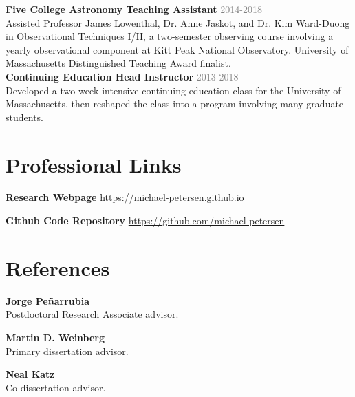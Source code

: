 \documentclass[margin, 11pt]{res} %
\begin{document}
\begin{resume}
{\bf Five College Astronomy Teaching Assistant} \hfill \textcolor{grey}{2014-2018}\\
Assisted Professor James Lowenthal, Dr. Anne Jaskot, and Dr. Kim Ward-Duong in Observational Techniques I/II, a two-semester observing course involving a yearly observational component at Kitt Peak National Observatory. University of Massachusetts Distinguished Teaching Award finalist.\\

{\bf Continuing Education Head Instructor} \hfill \textcolor{grey}{2013-2018}\\
Developed a two-week intensive continuing education class for the University of Massachusetts, then reshaped the class into a program involving many graduate students.

%


\section{\sc \textcolor{redshade}{Professional Links}}
{\bf Research Webpage} \url{https://michael-petersen.github.io}

{\bf Github Code Repository} \url{https://github.com/michael-petersen}


\section{\sc \textcolor{redshade}{References}}

{\bf Jorge Pe{\~n}arrubia}\\
Postdoctoral Research Associate advisor.

{\bf Martin D. Weinberg}\\
Primary dissertation advisor.

{\bf Neal Katz}\\
Co-dissertation advisor.


\end{resume}
\end{document}
